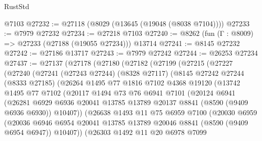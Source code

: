 \begin{lexlean}{RustStd}
\begin{coremodule}
    @7103
@27232 := @27118 (@8029 (@13645 (@19048 (@8038 @7104))))
@27233 := @7979 @27232
@27234 := @27218 @7103
@27240 := @8262 (fun (Γ : @8009) => @27233 (@27188 (@19055 @27234))) @13714
@27241 := @8145 @27232
@27242 := @27186 @13717
@27243 := @7979 @27242
@27244 := @26253 @27234
@27437 := @27137
    (@27178
      (@27180
        (@27182
          (@27199
            (@27215
              (@27227
                (@27240
                  (@27241
                    (@27243 @27244)
                    (@8328 @27117)
                    (@8145
                      @27242
                      @27244
                      (@8333 @27185)
                      (@26264
                        @1495
                        @77
                        @1816
                        @7102
                        @4368
                        @19120
                        (@13742
                          @1495
                          @77
                          @7102
                          (@20117
                            @1494
                            @73
                            @76
                            @6941
                            @7101
                            (@20124
                              @6941
                              (@26281
                                @6929
                                @6936
                                @20041
                                @13785
                                @13789
                                @20137
                                @8841
                                (@8590 (@9409 @6936 @6930))
                                @10407))
                            (@26638
                              @1493
                              @11
                              @75
                              @6959
                              @7100
                              (@20030
                                @6959
                                (@20036
                                  @6946
                                  @6954
                                  @20041
                                  @13785
                                  @13789
                                  @20046
                                  @8841
                                  (@8590 (@9409 @6954 @6947))
                                  @10407))
                              (@26303
                                @1492
                                @11
                                @20
                                @6978
                                @7099

\end{coremodule}
\end{lexlean}
